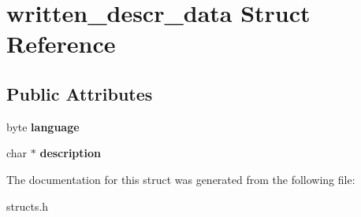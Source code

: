 \hypertarget{structwritten__descr__data}{\section{written\-\_\-descr\-\_\-data Struct Reference}
\label{structwritten__descr__data}
}
\subsection*{Public Attributes}
\begin{DoxyCompactItemize}
\item 
\hypertarget{structwritten__descr__data_a26e2f695529f670b9a3a32a47af3819a}{byte {\bfseries language}}\label{structwritten__descr__data_a26e2f695529f670b9a3a32a47af3819a}

\item 
\hypertarget{structwritten__descr__data_a2cc83d48eb44a53f648608a60645e931}{char $\ast$ {\bfseries description}}\label{structwritten__descr__data_a2cc83d48eb44a53f648608a60645e931}

\end{DoxyCompactItemize}


The documentation for this struct was generated from the following file\-:\begin{DoxyCompactItemize}
\item 
structs.\-h\end{DoxyCompactItemize}
